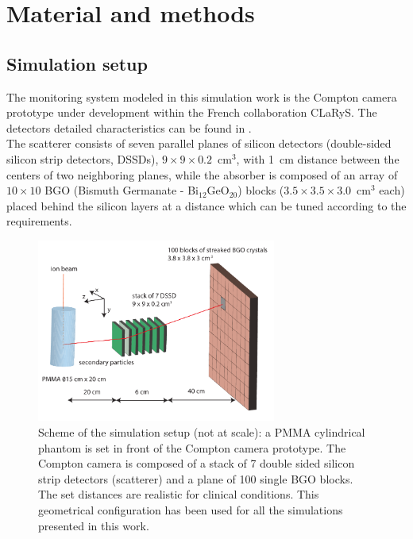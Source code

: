 \section{Material and methods}

\subsection{Simulation setup}\label{SimuSetup}

The monitoring system modeled in this simulation work is the Compton camera prototype under development within the French collaboration CLaRyS. The detectors detailed characteristics can be found in \cite{krimmer:hal-01101334}.\\
The scatterer consists of seven parallel planes of silicon detectors (double-sided silicon strip detectors, DSSDs), $9\times9\times0.2$~cm$^3$, with 1~cm distance between the centers of two neighboring planes, while the absorber is composed of an array of $10\times10$ BGO (Bismuth Germanate - Bi$_{12}$GeO$_{20}$) blocks ($3.5\times3.5\times3.0$~cm$^3$ each) placed behind the silicon layers at a distance which can be tuned according to the requirements.

\begin{figure}	
  \centering
  \includegraphics[width=0.7\textwidth]{./Figure/Compton_Camera_hadontherapy_PMMA_Cylinder_EN.pdf}
  \caption{Scheme of the simulation setup (not at scale): a PMMA cylindrical phantom is set in front of the Compton camera prototype. The Compton camera is composed of a stack of 7 double sided silicon strip detectors (scatterer) and a plane of 100 single BGO blocks. The set distances are realistic for clinical conditions. This geometrical configuration has been used for all the simulations presented in this work.}
  \label{fig:fig_setup_CC_simulation_Hadronth}
\end{figure}

